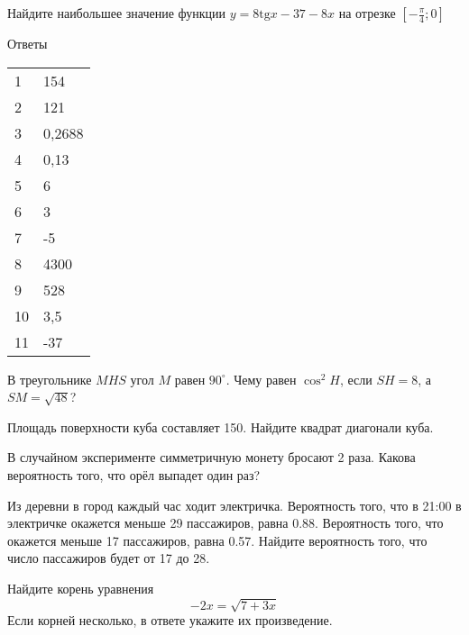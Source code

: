 \begin{taskBN}{11}
Найдите наибольшее значение функции $y = 8\mathrm{tg} x-37-8x$ на отрезке $\left[-\frac{\pi}{4};0 \right]$
\end{taskBN}

\newpage Ответы

\begin{table}\begin{tabular}{ll}
   1 & 154\\2 & 121\\3 & 0,2688\\4 & 0,13\\5 & 6\\6 & 3\\7 & -5\\8 & 4300\\9 & 528\\10 & 3,5\\11 & -37\\
\end{tabular}\end{table}

\cleardoublepage

\def\examvart{Вариант 13.3}

\normalsize



\startpartone\large

\begin{taskBN}{1}
В треугольнике $MHS$ угол $M$ равен $90^\circ$. Чему равен  $\cos^2{H}$, если $SH=8$, а  $SM=\sqrt{48}$? 
\end{taskBN}

\begin{taskBN}{2}
Площадь поверхности куба составляет 150. Найдите квадрат диагонали куба.
\end{taskBN}

\begin{taskBN}{3}
В случайном эксперименте симметричную монету бросают 2 раза. Какова вероятность того, что орёл выпадет один раз?
\end{taskBN}

\begin{taskBN}{4}
Из деревни в город каждый час ходит электричка. Вероятность того, что в 21:00 в электричке окажется меньше 29 пассажиров, равна 0.88. Вероятность того, что окажется меньше 17 пассажиров, равна 0.57. Найдите вероятность того, что число пассажиров будет от 17 до 28.
\end{taskBN}

\begin{taskBN}{5}
Найдите корень уравнения $$-2x=\sqrt{7+3x}$$ Если корней несколько, в ответе укажите их произведение.
\end{taskBN}


